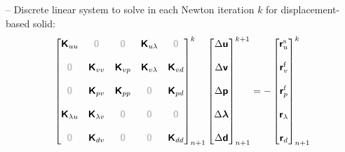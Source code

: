 \documentclass[a4paper,12pt]{report}
\newcommand{\bs}[1]{\boldsymbol{#1}}
\newcommand{\zerom}{\textcolor{lightgray}{\bs{\mathsf{0}}}}
\newcommand{\ROP}{\bs{\mathsf{r}}}
\newcommand{\LM}{\bs{\mathsf{\lambda}}}
\newcommand{\lmi}{\lambda} %
\begin{document}
-- Discrete linear system to solve in each Newton iteration $k$ for displacement-based solid:
\begin{align}
\begin{bmatrix} \bs{\mathsf{K}}_{uu} & \zerom & \zerom & \bs{\mathsf{K}}_{u\lmi} & \zerom \\ \\ \zerom & \bs{\mathsf{K}}_{vv} & \bs{\mathsf{K}}_{vp} & \bs{\mathsf{K}}_{v\lmi} & \bs{\mathsf{K}}_{vd} \\ \\ \zerom & \bs{\mathsf{K}}_{pv} & \bs{\mathsf{K}}_{pp} & \zerom & \bs{\mathsf{K}}_{pd} \\ \\ \bs{\mathsf{K}}_{\lmi u} & \bs{\mathsf{K}}_{\lmi v} & \zerom & \zerom & \zerom \\ \\ \zerom &  \bs{\mathsf{K}}_{dv}  & \zerom & \zerom & \bs{\mathsf{K}}_{dd} \end{bmatrix}_{n+1}^{k}\begin{bmatrix} \Delta\bs{\mathsf{u}} \\ \\ \Delta\bs{\mathsf{v}} \\ \\ \Delta\bs{\mathsf{p}} \\ \\ \Delta\LM \\ \\ \Delta\bs{\mathsf{d}} \end{bmatrix}_{n+1}^{k+1}=-\begin{bmatrix} \ROP_{u}^{\mathrm{s}} \\ \\ \ROP_{v}^{\mathrm{f}} \\ \\ \ROP_{p}^{\mathrm{f}} \\ \\ \ROP_{\lmi} \\ \\ \ROP_{d}\end{bmatrix}_{n+1}^{k} \label{eq:lin_sys_fsi}
\end{align}
\end{document}
